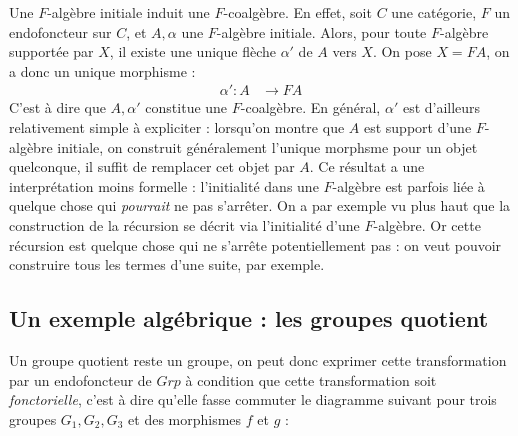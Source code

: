 \documentclass{article}
\begin{document}
Une $F$-algèbre initiale induit une $F$-coalgèbre. En effet, soit $C$ une catégorie, $F$ un endofoncteur sur $C$, et $A, \alpha$ une $F$-algèbre initiale. Alors, pour toute $F$-algèbre supportée par $X$, il existe une unique flèche $ \alpha'$ de $A$ vers $X$. On pose $X = FA$, on a donc un unique morphisme : 
\begin{align*}
    \alpha' : A & \rightarrow FA 
\end{align*}
C'est à dire que $A, \alpha'$ constitue une $F$-coalgèbre. En général, $\alpha'$ est d'ailleurs relativement simple à expliciter : lorsqu'on montre que $A$ est support d'une $F$-algèbre initiale, on construit généralement l'unique morphsme pour un objet quelconque, il suffit de remplacer cet objet par $A$.
Ce résultat a une interprétation moins formelle : l'initialité dans une $F$-algèbre est parfois liée à quelque chose qui \textit{pourrait} ne pas s'arrêter. On a par exemple vu plus haut que la construction de la récursion se décrit via l'initialité d'une $F$-algèbre. Or cette récursion est quelque chose qui ne s'arrête potentiellement pas : on veut pouvoir construire tous les termes d'une suite, par exemple. 

\subsection{Un exemple algébrique : les groupes quotient}

Un groupe quotient reste un groupe, on peut donc exprimer cette transformation par un endofoncteur de $Grp$ à condition que cette transformation soit \textit{fonctorielle}, c'est à dire qu'elle fasse commuter le diagramme suivant pour trois groupes $G_1,G_2,G_3$ et des morphismes $f$ et $g$ : 

\begin{center}
\end{center}
\end{document}
